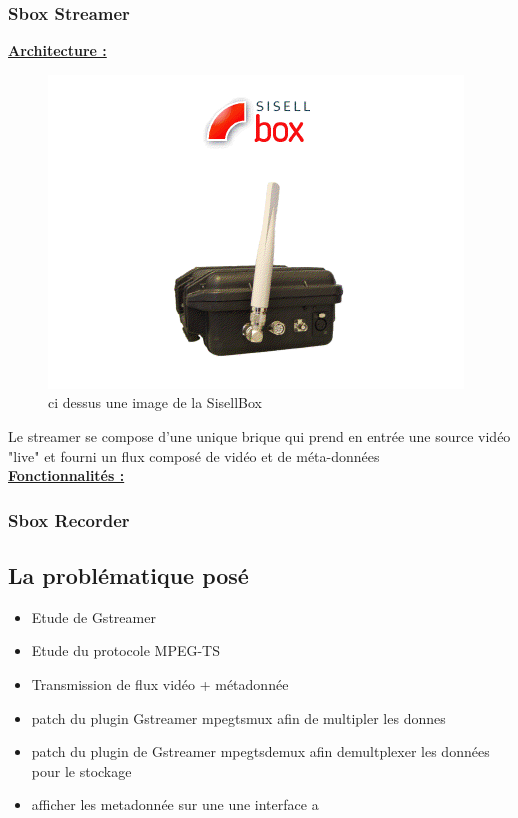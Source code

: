 \subsubsection{Sbox Streamer}

\textbf{\underline{Architecture :}}\\

\begin{figure}[!h]
  \centering
  \includegraphics{figures/sbox}
  \caption{ci dessus une image de la SisellBox}
\end{figure}

Le streamer se compose d'une unique brique qui prend en entrée une source vidéo
"live" et fourni un flux composé de vidéo et de méta-données
\\
\textbf{\underline{Fonctionnalités :}}\\


\subsubsection{Sbox Recorder}


\subsection{La problématique posé}
\begin{itemize}
  \item Etude de Gstreamer
  \item Etude du protocole MPEG-TS
  \item Transmission de flux vidéo + métadonnée
  \item patch du plugin Gstreamer mpegtsmux afin de  multipler les donnes
  \item patch du plugin de Gstreamer mpegtsdemux afin demultplexer les données pour le stockage
  \item afficher les metadonnée sur une une interface a
\end{itemize}
